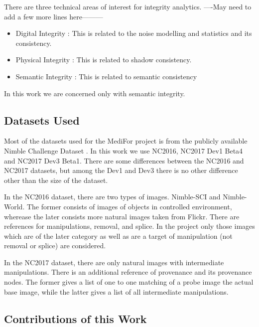 \documentclass{article}
\begin{document}
There are three technical areas of interest for integrity analytics. \cite{MedF_dw}
\newline
----May need to add a few more lines here---------
\begin{itemize}
\item Digital Integrity : This is related to the noise modelling and statistics and its consistency.
\item Physical Integrity : This is related to shadow consistency.
\item Semantic Integrity : This is related to semantic consistency
\end{itemize}

In this work we are concerned only with semantic integrity.

\subsection{Datasets Used}
Most of the datasets used for the MediFor project is from the publicly available Nimble Challenge Dataset \cite{Nimble}. In this work we use NC2016, NC2017 Dev1 Beta4 and NC2017 Dev3 Beta1. There are some differences between the NC2016 and NC2017 datasets, but among the Dev1 and Dev3 there is no other difference other than the size of the dataset.

In the NC2016 dataset, there are two types of images. Nimble-SCI and Nimble-World. The former consists of images of objects in controlled environment, wherease the later consists more natural images taken from Flickr. There are references for manipulations, removal, and splice. In the project only those images which are of the later category as well as are a target of manipulation (not removal or splice) are considered.

In the NC2017 dataset, there are only natural images with intermediate manipulations. There is an additional reference of provenance and its provenance nodes. The former gives a list of one to one matching of a probe image the actual base image, while the latter gives a list of all intermediate manipulations.

\subsection{Contributions of this Work}

\end{document}
